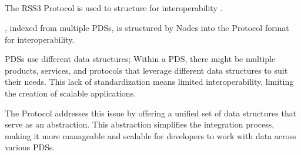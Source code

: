\subsection{}
\label{subsec:protocol}

The RSS3 Protocol is used to structure  for interoperability \cite{protocol}.

, indexed from multiple \glspl{PDS}, is structured by \glspl{Node} into the \gls{Protocol} format for interoperability.

\glspl{PDS} use different data structures;
Within a \gls{PDS}, there might be multiple products, services, and protocols that leverage different data structures to suit their needs.
This lack of standardization means limited interoperability, limiting the creation of scalable applications.

The \gls{Protocol} addresses this issue by offering a unified set of data structures that serve as an abstraction.
This abstraction simplifies the integration process, making it more manageable and scalable for developers to work with data across various \glspl{PDS}.
